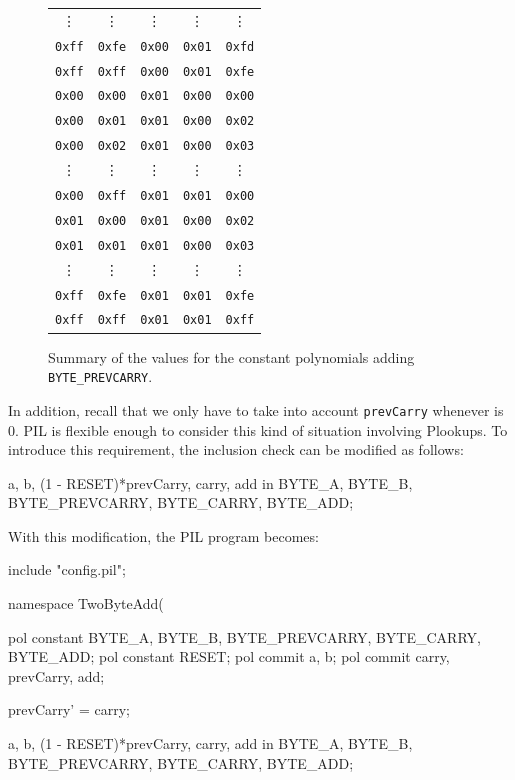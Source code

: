 \begin{figure}[h!]
\begin{tabular}{|c|c|c|c|c|}
        \vdots				&\vdots				&\vdots						&\vdots					&\vdots				  \\
        \texttt{0xff}		&\texttt{0xfe}		&\texttt{0x00}				&\texttt{0x01}			&\texttt{0xfd}		  \\
        \texttt{0xff}		&\texttt{0xff}		&\texttt{0x00}				&\texttt{0x01}			&\texttt{0xfe}		  \\
        \texttt{0x00}		&\texttt{0x00}		&\texttt{0x01}				&\texttt{0x00}			&\texttt{0x00}		  \\
        \texttt{0x00}		&\texttt{0x01}		&\texttt{0x01}				&\texttt{0x00}			&\texttt{0x02}		  \\
        \texttt{0x00}		&\texttt{0x02}		&\texttt{0x01}				&\texttt{0x00}			&\texttt{0x03}		  \\
        \vdots				&\vdots				&\vdots						&\vdots					&\vdots		         \\	
        \texttt{0x00}		&\texttt{0xff}		&\texttt{0x01}				&\texttt{0x01}			&\texttt{0x00}		  \\
        \texttt{0x01}		&\texttt{0x00}		&\texttt{0x01}				&\texttt{0x00}			&\texttt{0x02}		  \\
        \texttt{0x01}		&\texttt{0x01}		&\texttt{0x01}				&\texttt{0x00}			&\texttt{0x03}		  \\
        \vdots				&\vdots				&\vdots						&\vdots					&\vdots				  \\
        \texttt{0xff}		&\texttt{0xfe}		&\texttt{0x01}				&\texttt{0x01}			&\texttt{0xfe}		  \\
        \texttt{0xff}		&\texttt{0xff}		&\texttt{0x01}				&\texttt{0x01}			&\texttt{0xff}		  \\
        \hline
    \end{tabular}
    \caption{Summary of the values for the constant polynomials adding \texttt{BYTE\_PREVCARRY}.}
    \label{table:2-bytes-sum-const-prevcarry}
\end{figure}


In addition, recall that we only have to take into account \texttt{prevCarry} whenever \RESET is $0$. PIL is flexible enough to consider this kind of situation involving Plookups. To introduce this requirement, the inclusion check can be modified as follows:
\begin{pil}
    {a, b, (1 - RESET)*prevCarry, carry, add} in {BYTE_A, BYTE_B, BYTE_PREVCARRY, BYTE_CARRY, BYTE_ADD};
\end{pil}

With this modification, the PIL program becomes:
\begin{pil}
    include "config.pil";
    
    namespace TwoByteAdd(%
    
    pol constant BYTE_A, BYTE_B, BYTE_PREVCARRY, BYTE_CARRY, BYTE_ADD;
    pol constant RESET;
    pol commit a, b;
    pol commit carry, prevCarry, add;
    
    prevCarry' = carry;
    
    {a, b, (1 - RESET)*prevCarry, carry, add} in {BYTE_A, BYTE_B, BYTE_PREVCARRY, BYTE_CARRY, BYTE_ADD};
\end{pil}


